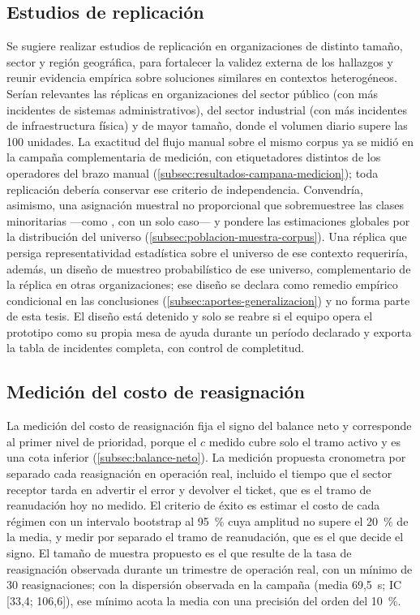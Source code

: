\subsection{Estudios de replicación}\label{subsec:estudios-replicacion}

Se sugiere realizar estudios de replicación en organizaciones de distinto tamaño, sector y región geográfica, para fortalecer la validez externa de los hallazgos y reunir evidencia empírica sobre soluciones similares en contextos heterogéneos. Serían relevantes las réplicas en organizaciones del sector público (con más incidentes de sistemas administrativos), del sector industrial (con más incidentes de infraestructura física) y de mayor tamaño, donde el volumen diario supere las 100 unidades. La exactitud del flujo manual sobre el mismo corpus ya se midió en la campaña complementaria de medición, con etiquetadores distintos de los operadores del brazo manual (\autoref{subsec:resultados-campana-medicion}); toda replicación debería conservar ese criterio de independencia. Convendría, asimismo, una asignación muestral no proporcional que sobremuestree las clases minoritarias ---como , con un solo caso--- y pondere las estimaciones globales por la distribución del universo (\autoref{subsec:poblacion-muestra-corpus}). Una réplica que persiga representatividad estadística sobre el universo de ese contexto requeriría, además, un diseño de muestreo probabilístico de ese universo, complementario de la réplica en otras organizaciones; ese diseño se declara como remedio empírico condicional en las conclusiones (\autoref{subsec:aportes-generalizacion}) y no forma parte de esta tesis. El diseño está detenido y solo se reabre si el equipo opera el prototipo como su propia mesa de ayuda durante un período declarado y exporta la tabla de incidentes completa, con control de completitud.

\subsection{Medición del costo de reasignación}\label{subsec:medicion-costo-reasignacion}

La medición del costo de reasignación fija el signo del balance neto y corresponde al primer nivel de prioridad, porque el \(c\) medido cubre solo el tramo activo y es una cota inferior (\autoref{subsec:balance-neto}). La medición propuesta cronometra por separado cada reasignación en operación real, incluido el tiempo que el sector receptor tarda en advertir el error y devolver el ticket, que es el tramo de reanudación hoy no medido. El criterio de éxito es estimar el costo de cada régimen con un intervalo bootstrap al 95~\% cuya amplitud no supere el 20~\% de la media, y medir por separado el tramo de reanudación, que es el que decide el signo. El tamaño de muestra propuesto es el que resulte de la tasa de reasignación observada durante un trimestre de operación real, con un mínimo de 30 reasignaciones; con la dispersión observada en la campaña (media 69,5~s; IC [33,4; 106,6]), ese mínimo acota la media con una precisión del orden del 10~\%.

